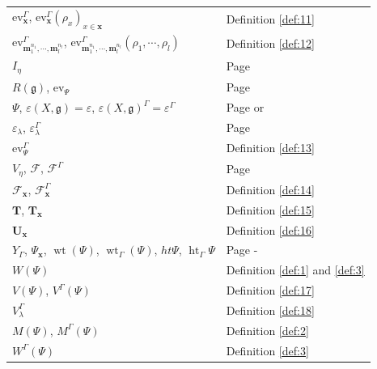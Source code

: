 \documentclass[11pt]{amsart}
\theoremstyle{plain}
\theoremstyle{definition}
\newcommand{\g}{\mathfrak{g}}
\DeclareMathOperator{\het}{ht}
\DeclareMathOperator{\wt}{wt}
\begin{document}
\begin{minipage}[t]{0.48\textwidth}
\centering
      \begin{tabular}{p{5cm}p{2.5cm}}
       
      
       $\mbox{ev}_{\textbf{x}}^{\Gamma}$, $\mbox{ev}^{\Gamma}_{\textbf{x}}(\rho_{x})_{x\in\textbf{x}}$ & Definition \ref{def:11}\\
       $\mbox{ev}^{\Gamma}_{\textbf{m}_{1}^{n_{1}},\cdots,\textbf{m}_{l}^{n_{l}}}$, $\mbox{ev}^{\Gamma}_{\textbf{m}_{1}^{n_{1}},\cdots,\textbf{m}_{l}^{n_{l}}}(\rho_{1},\cdots,\rho_{l})$ & Definition \ref{def:12}\\
       $I_{\eta}$ & Page \pageref{pg:7}\\
       $R(\g)$,  $\mbox{ev}_{\Psi}$ & Page \pageref{pg:8}\\
        $\Psi$, $\varepsilon(X,\g)=\varepsilon$, $\varepsilon(X,\g)^{\Gamma}=\varepsilon^{\Gamma}$ & Page \pageref{pg:8} or \pageref{pg:10}\\
        $\varepsilon_{\lambda}$, $\varepsilon^{\Gamma}_{\lambda}$ & Page \pageref{pg:12}\\ 
        $\mbox{ev}_{\Psi}^{\Gamma}$ & Definition \ref{def:13}\\
       $V_{\eta}$, $\mathcal{F}$, $\mathcal{F}^{\Gamma}$ & Page \pageref{pg:9}\\
       $\mathcal{F}_{\textbf{x}}$, $\mathcal{F}_{\textbf{x}}^{\Gamma}$ & Definition \ref{def:14}\\
       $\textbf{T}$, $\textbf{T}_{\textbf{x}}$ & Definition \ref{def:15}\\
       $\textbf{U}_{\textbf{x}}$ & Definition \ref{def:16}\\
       $Y_{\Gamma}$, $\Psi_{\textbf{x}}$, $\wt(\Psi)$, $\wt_{\Gamma}(\Psi)$, $ht\Psi$, $\het_{\Gamma}\Psi$ & Page \pageref{pg:11}-\pageref{pg:13}\\
       $W(\Psi)$ & Definition \ref{def:1} and \ref{def:3}\\
       $V(\Psi)$, $V^{\Gamma}(\Psi)$ & Definition \ref{def:17}\\
       $V_{\lambda}^{\Gamma}$ & Definition \ref{def:18}\\
       $M(\Psi)$, $M^{\Gamma}(\Psi)$ & Definition \ref{def:2}\\
       $W^{\Gamma}(\Psi)$ & Definition \ref{def:3}\\
       
       \end{tabular}
\end{minipage}
\end{document}
